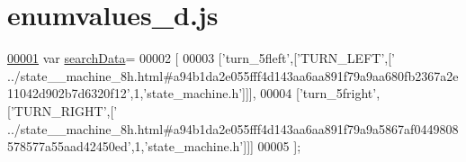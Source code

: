\hypertarget{enumvalues__d_8js_source}{}\section{enumvalues\+\_\+d.\+js}
\label{enumvalues__d_8js_source}

\begin{DoxyCode}
\hypertarget{enumvalues__d_8js_source.tex_l00001}{}\hyperlink{enumvalues__d_8js_ad01a7523f103d6242ef9b0451861231e}{00001} var \hyperlink{enumvalues__d_8js_ad01a7523f103d6242ef9b0451861231e}{searchData}=
00002 [
00003   [\textcolor{stringliteral}{'turn\_5fleft'},[\textcolor{stringliteral}{'TURN\_LEFT'},[\textcolor{stringliteral}{'
      ../state\_\_machine\_8h.html#a94b1da2e055fff4d143aa6aa891f79a9aa680fb2367a2e11042d902b7d6320f12'},1,\textcolor{stringliteral}{'state\_machine.h'}]]],
00004   [\textcolor{stringliteral}{'turn\_5fright'},[\textcolor{stringliteral}{'TURN\_RIGHT'},[\textcolor{stringliteral}{'
      ../state\_\_machine\_8h.html#a94b1da2e055fff4d143aa6aa891f79a9a5867af0449808578577a55aad42450ed'},1,\textcolor{stringliteral}{'state\_machine.h'}]]]
00005 ];
\end{DoxyCode}
